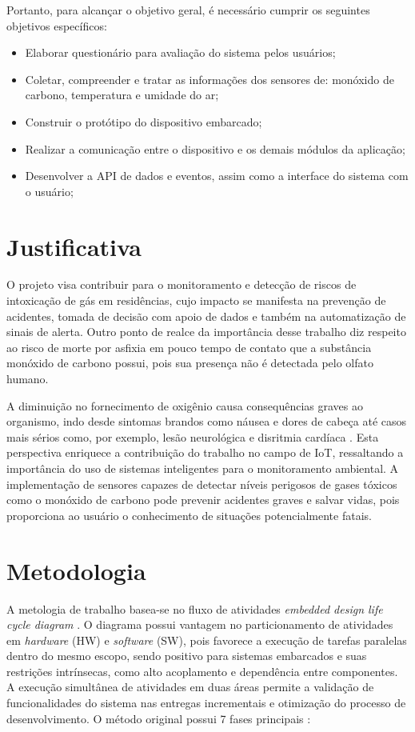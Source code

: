 Portanto, para alcançar o objetivo geral, é necessário cumprir os seguintes objetivos específicos:
\begin{itemize}
    \item Elaborar questionário para avaliação do sistema pelos usuários;
    \item Coletar, compreender e tratar as informações dos sensores de: monóxido de carbono, temperatura e umidade do ar;
    \item Construir o protótipo do dispositivo embarcado;
    \item Realizar a  comunicação entre o dispositivo e os demais módulos da aplicação;
    \item Desenvolver a API de dados e eventos, assim como a interface do sistema com o usuário;
\end{itemize}

\section{Justificativa}

O projeto visa contribuir para o monitoramento e detecção de riscos de intoxicação de gás em residências, cujo impacto se manifesta na prevenção de acidentes, tomada de decisão com apoio de dados e também na automatização de sinais de alerta. Outro ponto de realce da importância desse trabalho diz respeito ao risco de morte por asfixia em pouco tempo de contato que a substância monóxido de carbono possui, pois sua presença não é detectada pelo olfato humano. 

A diminuição no fornecimento de oxigênio causa consequências graves ao organismo, indo desde sintomas brandos como náusea e dores de cabeça até casos mais sérios como, por exemplo, lesão neurológica e disritmia cardíaca \cite{carbon-monoxide-poisoning-varon}. Esta perspectiva enriquece a contribuição do trabalho no campo de IoT, ressaltando a importância do uso de sistemas inteligentes para o monitoramento ambiental. A implementação de sensores  capazes de detectar níveis perigosos de gases tóxicos como o monóxido de carbono pode prevenir acidentes graves e salvar vidas, pois proporciona ao usuário o conhecimento de situações potencialmente fatais. 

\section{Metodologia}

A metologia de trabalho basea-se no fluxo de atividades \textit{embedded design life cycle diagram} \cite{system-design-IOT}. O diagrama possui vantagem no particionamento de atividades em  \textit{hardware} (HW) e \textit{software} (SW), pois favorece a  execução de tarefas paralelas dentro do mesmo escopo, sendo positivo para sistemas embarcados e suas restrições intrínsecas, como alto acoplamento e dependência entre componentes. A execução simultânea de atividades em duas áreas permite a validação de funcionalidades do sistema nas entregas incrementais e otimização do processo de desenvolvimento. O método original possui 7 fases principais :  

